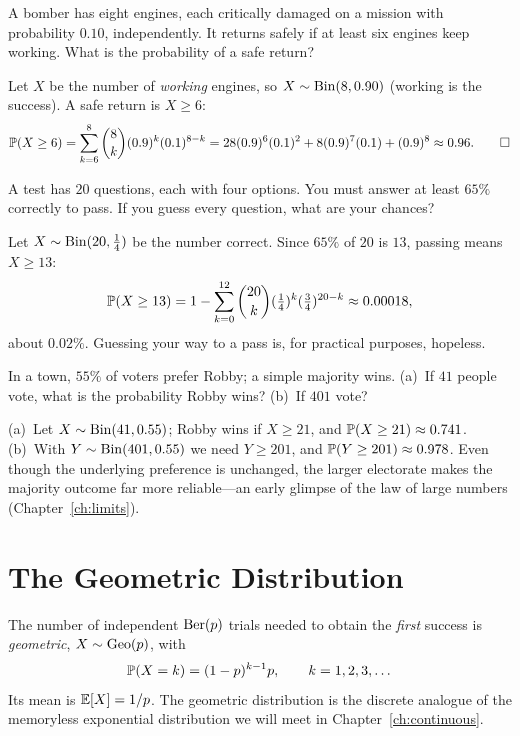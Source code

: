\begin{example}
A bomber has eight engines, each critically damaged on a mission with
probability $0.10$, independently. It returns safely if at least six engines
keep working. What is the probability of a safe return?

\solution Let $X$ be the number of \emph{working} engines, so $X\sim\mathrm{Bin}(8,0.90)$
(working is the success). A safe return is $X\ge 6$:
\[
  \mathbb{P}(X\ge 6)=\sum_{k=6}^{8}\binom{8}{k}(0.9)^k(0.1)^{8-k}
   =28(0.9)^6(0.1)^2+8(0.9)^7(0.1)+(0.9)^8\approx 0.96. \qedhere
\]
\end{example}

\begin{example}
A test has $20$ questions, each with four options. You must answer at least
$65\%$ correctly to pass. If you guess every question, what are your chances?

\solution Let $X\sim\mathrm{Bin}(20,\tfrac14)$ be the number correct. Since $65\%$ of
$20$ is $13$, passing means $X\ge 13$:
\[
  \mathbb{P}(X\ge 13)=1-\sum_{k=0}^{12}\binom{20}{k}(\tfrac14)^k(\tfrac34)^{20-k}
   \approx 0.00018,
\]
about $0.02\%$. Guessing your way to a pass is, for practical purposes,
hopeless.
\end{example}

\begin{example}
In a town, $55\%$ of voters prefer Robby; a simple majority wins. (a)~If $41$
people vote, what is the probability Robby wins? (b)~If $401$ vote?

\solution (a)~Let $X\sim\mathrm{Bin}(41,0.55)$; Robby wins if $X\ge 21$, and
$\mathbb{P}(X\ge 21)\approx 0.741$. (b)~With $Y\sim\mathrm{Bin}(401,0.55)$ we need
$Y\ge 201$, and $\mathbb{P}(Y\ge 201)\approx 0.978$. Even though the underlying
preference is unchanged, the larger electorate makes the majority outcome far
more reliable—an early glimpse of the law of large numbers
(Chapter~\ref{ch:limits}).
\end{example}

\section{The Geometric Distribution}

The number of independent $\mathrm{Ber}(p)$ trials needed to obtain the \emph{first}
success is \emph{geometric}, $X\sim\mathrm{Geo}(p)$, with
\[
  \mathbb{P}(X=k)=(1-p)^{k-1}p,\qquad k=1,2,3,\dots
\]
Its mean is $\mathbb{E}[X]=1/p$. The geometric distribution is the discrete analogue of
the memoryless exponential distribution we will meet in
Chapter~\ref{ch:continuous}.


